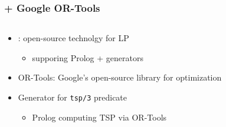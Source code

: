 \documentclass[presentation]{beamer}
\begin{document}
\begin{frame}%
\frametitle{\twopkt{} + Google OR-Tools}
    \begin{columns}
        \begin{column}{.62\linewidth}
            \begin{itemize}
                \item \alert{\twopkt{}}: open-source technolgy for LP 
                \begin{itemize}
                    \item supporing Prolog + generators
                \end{itemize}

                \bigskip

                \item \alert{OR-Tools}: Google's open-source library for optimization 
                
                \bigskip

                \item Generator for \alert{\texttt{tsp/3}} predicate\footnotemark
                \begin{itemize}
                    \item Prolog computing TSP via OR-Tools
                \end{itemize}


\end{itemize}
\end{column}
\end{columns}
\end{frame}
\end{document}
